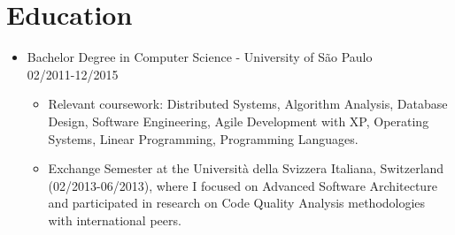 
\section{Education}
\begin{itemize}
    \item \footnotesize{Bachelor Degree in Computer Science - University of São Paulo}\\
    \scriptsize{02/2011-12/2015}
    \begin{itemize}
        \item \scriptsize{Relevant coursework: Distributed Systems, Algorithm Analysis, Database Design, Software Engineering, Agile Development with XP, Operating Systems, Linear Programming, Programming Languages.}
        \item \scriptsize{Exchange Semester at the Università della Svizzera Italiana, Switzerland (02/2013-06/2013), where I focused on Advanced Software Architecture and participated in research on Code Quality Analysis methodologies with international peers.}
    \end{itemize}
\end{itemize}
